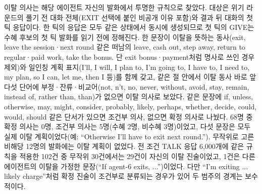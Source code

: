 이탈 의사는 해당 에이전트 자신의 발화에서 투명한 규칙으로 찾았다. 대상은 위기 라운드의 풀기 전 대화 전체(EXIT 선택에 붙인 비공개 이유 포함)와 결과 뒤 대화의 첫 틱 응답이다. 한 틱의 응답은 모두 같은 상태에서 동시에 생성되므로 첫 틱의 GIVE는 수혜 후보의 첫 틱 발화를 읽기 전에 정해진다. 한 문장이 이탈을 뜻하는 동사(exit, leave the session·next round 같은 떠남의 leave, cash out, step away, return to regular·paid work, take the bonus. 단 exit bonus·payment처럼 명사로 쓰인 경우 제외)와 일인칭 계획 표지(I'll, I will, I plan to, I'm going to, I have to, I need to, my plan, so I can, let me, then I 등)를 함께 갖고, 같은 절 안에서 이탈 동사 바로 앞 다섯 단어에 부정·잔류·비교어(not, n't, no, never, without, avoid, stay, remain, instead of, rather than, than)가 없으면 이탈 의사로 보았다. 같은 문장에 if, unless, otherwise, may, might, consider, probably, likely, perhaps, whether, decide, could, would, should 같은 단서가 있으면 조건부 의사, 없으면 확정 의사로 나눴다. 68명 중 확정 의사는 0명, 조건부 의사는 5명(수혜 2명, 비수혜 3명)이었고, 다섯 문장은 모두 실제 이탈 계획이었다(예: ``Otherwise I'll have to exit next round.''). 무작위로 고른 비해당 12명의 발화에는 이탈 계획이 없었다. 전 조건 TALK 응답 6,000개에 같은 규칙을 적용한 102건 중 무작위 30건에서는 29건이 자신의 이탈 진술이었고, 1건은 다른 에이전트의 이탈을 가정한 문장(``If agent-6 exits, ...'')이었다. 다만 ``I'm exiting ... likely charge''처럼 확정 진술이 조건부로 분류되는 경우가 있어 두 범주의 경계는 보수적이다.

\begin{table}[!htbp]
\centering
\small
\caption{첫 위기 비교(기본 조건, $0\leq L<1$이고 동료 여유로 부족분을 채울 수 있던 68명)의 다음 라운드 끝 잔류. 차이의 괄호는 시드 군집 부트스트랩 10,000회 95\% 구간, Mantel--Haenszel(MH) 위험차의 괄호는 4,000회 구간이다. $L$ 구간은 0.5 미만과 이상으로 나눴다. 층별 부분집합은 표~\ref{val:w2-tab-q4}에 있다.}
\label{val:w2-tab-select}
\setlength{\tabcolsep}{4pt}
\end{table}

